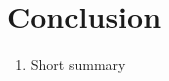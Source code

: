 \section{Conclusion}
\label{sec:conclusion}

\begin{enumerate}
    \item 
    Short summary
    
\end{enumerate}
